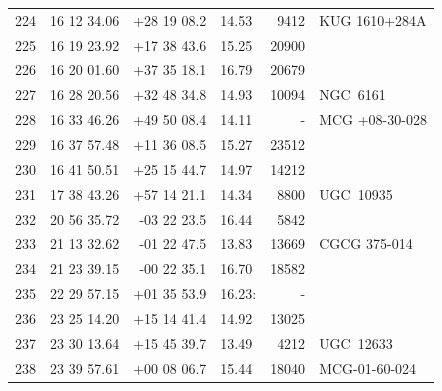 \documentclass[useAMS,usenatbib]{mn2e}
\begin{document}
\begin{table}
\begin{tabular}{rrrlrl}
 224 &  16 12 34.06 & +28 19 08.2 &  14.53 &   9412 &    KUG 1610+284A \\
 225 &  16 19 23.92 & +17 38 43.6 &  15.25 &  20900 &                  \\
 226 &  16 20 01.60 & +37 35 18.1 &  16.79 &  20679 &                  \\
 227 &  16 28 20.56 & +32 48 34.8 &  14.93 &  10094 &         NGC~6161 \\
 228 &  16 33 46.26 & +49 50 08.4 &  14.11 &      - &   MCG +08-30-028 \\
 229 &  16 37 57.48 & +11 36 08.5 &  15.27 &  23512 &                  \\
 230 &  16 41 50.51 & +25 15 44.7 &  14.97 &  14212 &                  \\
 231 &  17 38 43.26 & +57 14 21.1 &  14.34 &   8800 &        UGC~10935 \\
 232 &  20 56 35.72 & -03 22 23.5 &  16.44 &   5842 &                  \\
 233 &  21 13 32.62 & -01 22 47.5 &  13.83 &  13669 &     CGCG 375-014 \\
 234 &  21 23 39.15 & -00 22 35.1 &  16.70 &  18582 &                  \\
 235 &  22 29 57.15 & +01 35 53.9 & 16.23: &      - &                  \\
 236 &  23 25 14.20 & +15 14 41.4 &  14.92 &  13025 &                  \\
 237 &  23 30 13.64 & +15 45 39.7 &  13.49 &   4212 &UGC~12633         \\
 238 &  23 39 57.61 & +00 08 06.7 &  15.44 &  18040 &     MCG-01-60-024\\
 \hline
\end{tabular}
\end{table}
\end{document}
